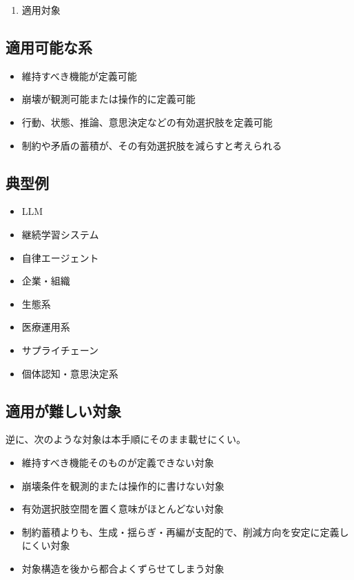 \documentclass[12pt,a4paper]{article}
\begin{document}
\begin{enumerate}
\def\labelenumi{\arabic{enumi}.}
\setcounter{enumi}{2}
\tightlist
\item
  適用対象
\end{enumerate}

\subsection{適用可能な系}\label{ux9069ux7528ux53efux80fdux306aux7cfb}

\begin{itemize}
\tightlist
\item
  維持すべき機能が定義可能
\item
  崩壊が観測可能または操作的に定義可能
\item
  行動、状態、推論、意思決定などの有効選択肢を定義可能
\item
  制約や矛盾の蓄積が、その有効選択肢を減らすと考えられる
\end{itemize}

\subsection{典型例}\label{ux5178ux578bux4f8b}

\begin{itemize}
\tightlist
\item
  LLM
\item
  継続学習システム
\item
  自律エージェント
\item
  企業・組織
\item
  生態系
\item
  医療運用系
\item
  サプライチェーン
\item
  個体認知・意思決定系
\end{itemize}

\subsection{適用が難しい対象}\label{ux9069ux7528ux304cux96e3ux3057ux3044ux5bfeux8c61}

逆に、次のような対象は本手順にそのまま載せにくい。

\begin{itemize}
\tightlist
\item
  維持すべき機能そのものが定義できない対象
\item
  崩壊条件を観測的または操作的に書けない対象
\item
  有効選択肢空間を置く意味がほとんどない対象
\item
  制約蓄積よりも、生成・揺らぎ・再編が支配的で、削減方向を安定に定義しにくい対象
\item
  対象構造を後から都合よくずらせてしまう対象
\end{itemize}
\end{document}
